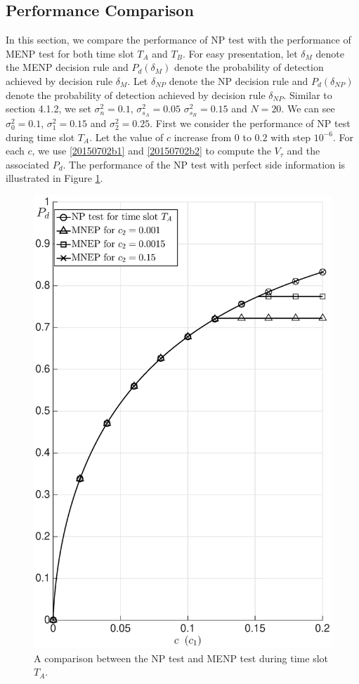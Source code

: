 \subsection{Performance Comparison}
In this section, we compare the performance of NP test with the performance of MENP test for both time slot $T_A$ and $T_B$. For easy presentation, let $\delta_{M}$ denote the MENP decision rule and $P_d(\delta_M)$ denote the probability of detection achieved by decision rule $\delta_{M}$.  
Let $\delta_{NP} $ denote the NP decision rule and $P_d(\delta_{NP})$ denote the probability of detection achieved by decision rule $\delta_{NP}$. 
Similar to section 4.1.2, we set $\sigma_n^2= 0.1$, $\sigma_{s_A}^2 = 0.05$ $\sigma_{s_B}^2 = 0.15$ and $N=20$. We can see $\sigma_0^2 = 0.1$, $\sigma_1^2=0.15$ and $\sigma_2^2 = 0.25$. First we consider the performance of NP test during time slot $T_A$. Let the value of $c$ increase from $0$ to $0.2$ with step $10^{-6}$. For each $c$, we use \eqref{20150702b1} and \eqref{20150702b2} to compute the $V_\tau$ and the associated $P_d$.  
The performance of the NP test with perfect side information is illustrated in Figure \ref{pic:20150702a0}.  

\begin{figure}[!hbp]
  \centering
  \includegraphics[width = 12cm]{5/SIa.eps}
  \caption{A comparison between the NP test and MENP test during time slot $T_A$.} 
  \label{pic:20150702a0}
\end{figure} 

